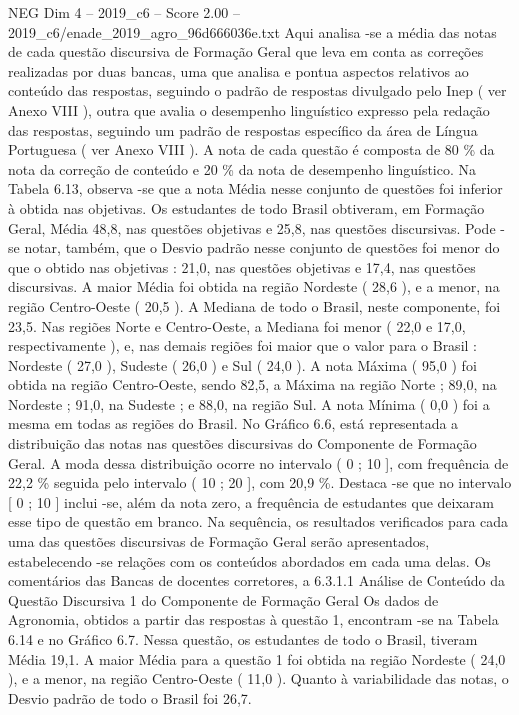 \begin{textsample}{NEG Dim 4 – 2019\_c6 – Score 2.00 – 2019\_c6/enade\_2019\_agro\_96d666036e.txt}
Aqui analisa -se a média das notas de cada questão discursiva de Formação Geral que leva em conta as correções realizadas por duas bancas, uma que analisa e pontua aspectos relativos ao conteúdo das respostas, seguindo o padrão de respostas divulgado pelo Inep ( ver Anexo VIII ), outra que avalia o desempenho linguístico expresso pela redação das respostas, seguindo um padrão de respostas específico da área de Língua Portuguesa ( ver Anexo VIII ).
A nota de cada questão é composta de 80 \% da nota da correção de conteúdo e 20 \% da nota de desempenho linguístico.
Na Tabela 6.13, observa -se que a nota Média nesse conjunto de questões foi inferior à obtida nas objetivas.
Os estudantes de todo Brasil obtiveram, em Formação Geral, Média 48,8, nas questões objetivas e 25,8, nas questões discursivas.
Pode -se notar, também, que o Desvio padrão nesse conjunto de questões foi menor do que o obtido nas objetivas : 21,0, nas questões objetivas e 17,4, nas questões discursivas.
A maior Média foi obtida na região Nordeste ( 28,6 ), e a menor, na região Centro-Oeste ( 20,5 ).
A Mediana de todo o Brasil, neste componente, foi 23,5.
Nas regiões Norte e Centro-Oeste, a Mediana foi menor ( 22,0 e 17,0, respectivamente ), e, nas demais regiões foi maior que o valor para o Brasil : Nordeste ( 27,0 ), Sudeste ( 26,0 ) e Sul ( 24,0 ).
A nota Máxima ( 95,0 ) foi obtida na região Centro-Oeste, sendo 82,5, a Máxima na região Norte ; 89,0, na Nordeste ; 91,0, na Sudeste ; e 88,0, na região Sul.
A nota Mínima ( 0,0 ) foi a mesma em todas as regiões do Brasil.
No Gráfico 6.6, está representada a distribuição das notas nas questões discursivas do Componente de Formação Geral.
A moda dessa distribuição ocorre no intervalo ( 0 ; 10 ], com frequência de 22,2 \% seguida pelo intervalo ( 10 ; 20 ], com 20,9 \%.
Destaca -se que no intervalo [ 0 ; 10 ] inclui -se, além da nota zero, a frequência de estudantes que deixaram esse tipo de questão em branco.
Na sequência, os resultados verificados para cada uma das questões discursivas de Formação Geral serão apresentados, estabelecendo -se relações com os conteúdos abordados em cada uma delas.
Os comentários das Bancas de docentes corretores, a 6.3.1.1 Análise de Conteúdo da Questão Discursiva 1 do Componente de Formação Geral Os dados de Agronomia, obtidos a partir das respostas à questão 1, encontram -se na Tabela 6.14 e no Gráfico 6.7.
Nessa questão, os estudantes de todo o Brasil, tiveram Média 19,1.
A maior Média para a questão 1 foi obtida na região Nordeste ( 24,0 ), e a menor, na região Centro-Oeste ( 11,0 ).
Quanto à variabilidade das notas, o Desvio padrão de todo o Brasil foi 26,7.

\end{textsample}
